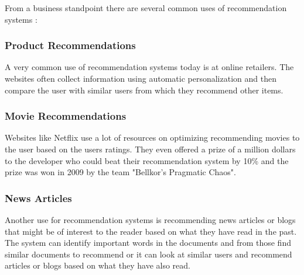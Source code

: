 From a business standpoint there are several common uses of recommendation systems \cite{MoMDatasets}:

\subsubsection{Product Recommendations}


A very common use of recommendation systems today is at online retailers. The websites often collect information using automatic personalization and then compare the user with similar users from which they recommend other items.


\subsubsection{Movie Recommendations}


Websites like Netflix use a lot of resources on optimizing recommending movies to the user based on the users ratings. They even offered a prize of a million dollars to the developer who could beat their recommendation system by 10\% and the prize was won in 2009 by the team "Bellkor's Pragmatic Chaos".


\subsubsection{News Articles}


Another use for recommendation systems is recommending news articles or blogs that might be of interest to the reader based on what they have read in the past. The system can identify important words in the documents and from those find similar documents to recommend or it can look at similar users and recommend articles or blogs based on what they have also read.    
